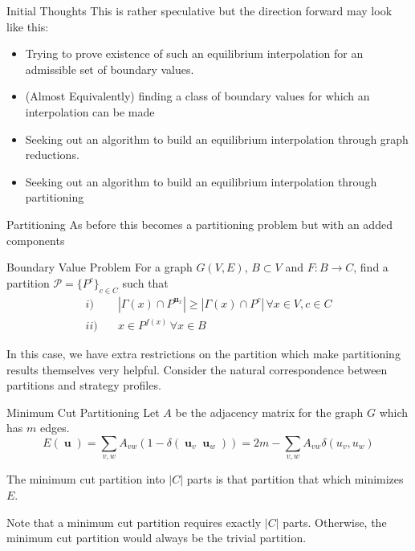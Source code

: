\documentclass{beamer}
\DeclareMathOperator{\uu}{\mathbf{u}}
\begin{document}
\begin{frame}{Initial Thoughts}
	This is rather speculative but the direction forward may look like this:
	\begin{itemize}
		\item Trying to prove existence of such an equilibrium interpolation for an admissible set of boundary values. 
		\item (Almost Equivalently) finding a class of boundary values for which an interpolation can be made
		\item Seeking out an algorithm to build an equilibrium interpolation through graph reductions.  
		\item Seeking out an algorithm to build an equilibrium interpolation through partitioning
	\end{itemize}
\end{frame}
\begin{frame}{Partitioning}
	As before this becomes a partitioning problem but with an added components
	\begin{block}{Boundary Value Problem }
		For a graph $G(V,E)$, $B\subset V$ and $F:B\rightarrow C$, find a partition $\mathcal{P}=\{P^{c}\}_{c\in C}$ such that 
		\begin{equation}
			\begin{split}
				i)\quad & |\Gamma(x)\cap P^{\uu_x}|\geq |\Gamma(x)\cap P^{c}|\,\forall x\in V, c\in C \\
				ii)\quad &  x\in P^{f(x)}\,\forall x\in B 
			\end{split}
		\end{equation}
	\end{block}
	In this case, we have extra restrictions on the partition which make partitioning results themselves very helpful. Consider the natural correspondence between partitions and strategy profiles.
\end{frame}

\begin{frame}{Minimum Cut Partitioning}
	Let $A$ be the adjacency matrix for the graph $G$ which has $m$ edges. 
	\begin{equation}
		E(\uu) = \sum_{v,w}A_{vw}(1-\delta(\uu_v\uu_w))= 2m-\sum_{v,w}A_{vw}\delta(u_v,u_w)	\end{equation}
	
	The minimum cut partition into $|C|$ parts is that partition that which minimizes $E$. 
	
	Note that a minimum cut partition requires exactly $|C|$ parts. Otherwise, the minimum cut partition would always be the trivial partition. 
\end{frame}
\end{document}
